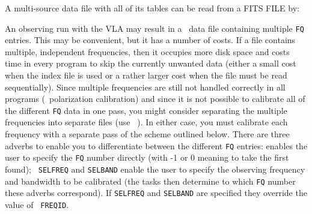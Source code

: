      A multi-source data file with all of its tables can be read from
a FITS FILE by:



     An observing run with the VLA may result in a \uv\ data file
containing multiple {\tt FQ} entries.  
This may be convenient, but it has a number of costs.  If a file
contains multiple, independent frequencies, then it occupies more disk
space and costs time in every program to skip the currently unwanted
data (either a small cost when the index file is used or a rather
larger cost when the file must be read sequentially).  Since multiple
frequencies are still not handled correctly in all programs (\ie\
polarization calibration) and since it is not possible to calibrate
all of the different {\tt FQ} data in one pass, you might consider
separating the multiple frequencies into separate files (use {\tt
\tndx{UVCOP}})\@.  In either case, you  must calibrate each frequency
with a separate pass of the scheme outlined below. There are three
adverbs to enable you to differentiate between the different {\tt FQ}
entries: {\tt \tndx{FREQID}} enables the user to specify the {\tt FQ}
number directly (with -1 or 0 meaning to take the first found); {\tt
SELFREQ} and {\tt SELBAND} enable the user to specify the observing
frequency and bandwidth to be calibrated (the tasks then determine to
which {\tt FQ} number these adverbs correspond). If {\tt SELFREQ} and
{\tt SELBAND} are specified they override the value of \hbox{{\tt
FREQID}}.\todx{FQ number}\Iodx{EVLA}

